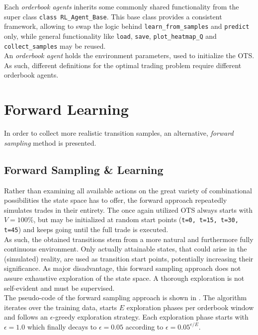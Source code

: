 Each \emph{orderbook agents} inherits some commonly shared functionality from the super class \lstinline!class RL_Agent_Base!. This base class provides a consistent framework, allowing to swap the logic behind \lstinline!learn_from_samples! and \lstinline!predict! only, while general functionality like \lstinline!load!, \lstinline!save!, \lstinline!plot_heatmap_Q! and \lstinline!collect_samples! may be reused.\\

An \emph{orderbook agent} holds the environment parameters, used to initialize the \ac{OTS}. As such, different definitions for the optimal trading problem require different orderbook agents.






\section{Forward Learning}
\label{chap:forwardlearning}
In order to collect more realistic transition samples, an alternative, \emph{forward sampling} method is presented.

\subsection{Forward Sampling \& Learning}
Rather than examining all available actions on the great variety of combinational possibilities the state space has to offer, the forward approach repeatedly simulates trades in their entirety. The once again utilized \ac{OTS} always starts with $V=100\%$, but may be initialized at random start points (\eg \lstinline!t=0, t=15, t=30, t=45!) and keeps going until the full trade is executed.\\

As such, the obtained transitions stem from a more natural and furthermore fully continuous environment. Only actually attainable states, that could arise in the (simulated) reality, are used as transition start points, potentially increasing their significance. As major disadvantage, this forward sampling approach does not assure exhaustive exploration of the state space. A thorough exploration is not self-evident and must be supervised.\\

The pseudo-code of the forward sampling approach is shown in . The algorithm iterates over the training data, starts $E$ exploration phases per orderbook window and follows an $\epsilon$-greedy exploration strategy. Each exploration phase starts with $\epsilon=1.0$ which finally decays to $\epsilon=0.05$ according to $\epsilon=0.05^{e/E}$.\\

